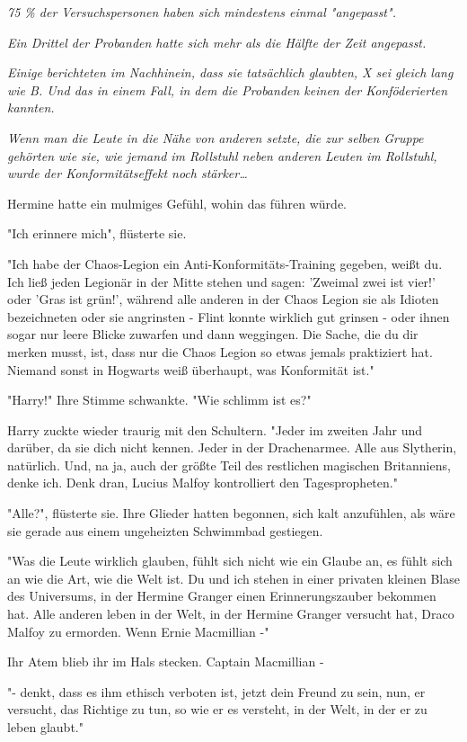 {\emph{75 \% der Versuchspersonen haben sich mindestens einmal "angepasst".}

\emph{Ein Drittel der Probanden hatte sich mehr als die Hälfte der Zeit angepasst.}

\emph{Einige berichteten im Nachhinein, dass sie tatsächlich glaubten, X sei gleich lang wie B. Und das in einem Fall, in dem die Probanden keinen der Konföderierten kannten.}

\emph{Wenn man die Leute in die Nähe von anderen setzte, die zur selben Gruppe gehörten wie sie, wie jemand im Rollstuhl neben anderen Leuten im Rollstuhl, wurde der Konformitätseffekt noch stärker…}

Hermine hatte ein mulmiges Gefühl, wohin das führen würde.

"Ich erinnere mich", flüsterte sie.

"Ich habe der Chaos-Legion ein Anti-Konformitäts-Training gegeben, weißt du. Ich ließ jeden Legionär in der Mitte stehen und sagen: 'Zweimal zwei ist vier!' oder 'Gras ist grün!', während alle anderen in der Chaos Legion sie als Idioten bezeichneten oder sie angrinsten - Flint konnte wirklich gut grinsen - oder ihnen sogar nur leere Blicke zuwarfen und dann weggingen. Die Sache, die du dir merken musst, ist, dass nur die Chaos Legion so etwas jemals praktiziert hat. Niemand sonst in Hogwarts weiß überhaupt, was Konformität ist."

"Harry!" Ihre Stimme schwankte. "Wie schlimm ist es?"

Harry zuckte wieder traurig mit den Schultern. "Jeder im zweiten Jahr und darüber, da sie dich nicht kennen. Jeder in der Drachenarmee. Alle aus Slytherin, natürlich. Und, na ja, auch der größte Teil des restlichen magischen Britanniens, denke ich. Denk dran, Lucius Malfoy kontrolliert den Tagespropheten."

"Alle?", flüsterte sie. Ihre Glieder hatten begonnen, sich kalt anzufühlen, als wäre sie gerade aus einem ungeheizten Schwimmbad gestiegen.

"Was die Leute wirklich glauben, fühlt sich nicht wie ein Glaube an, es fühlt sich an wie die Art, wie die Welt ist. Du und ich stehen in einer privaten kleinen Blase des Universums, in der Hermine Granger einen Erinnerungszauber bekommen hat. Alle anderen leben in der Welt, in der Hermine Granger versucht hat, Draco Malfoy zu ermorden. Wenn Ernie Macmillian -"

Ihr Atem blieb ihr im Hals stecken. Captain Macmillian -

"- denkt, dass es ihm ethisch verboten ist, jetzt dein Freund zu sein, nun, er versucht, das Richtige zu tun, so wie er es versteht, in der Welt, in der er zu leben glaubt."

}
